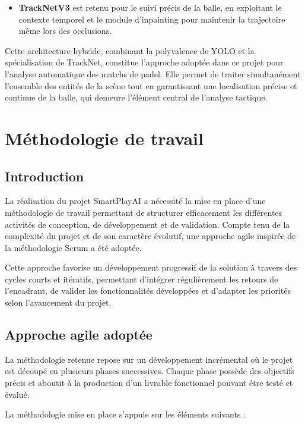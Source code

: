 \begin{itemize}
\begin{itemize}
    \item \textbf{TrackNetV3} est retenu pour le suivi précis de la balle, en
    exploitant le contexte temporel et le module d'inpainting pour maintenir la
    trajectoire même lors des occlusions.
\end{itemize}

Cette architecture hybride, combinant la polyvalence de YOLO et la spécialisation de
TrackNet, constitue l'approche adoptée dans ce projet pour l'analyse automatique des
matchs de padel. Elle permet de traiter simultanément l'ensemble des entités de la
scène tout en garantissant une localisation précise et continue de la balle, qui
demeure l'élément central de l'analyse tactique.

\section{Méthodologie de travail}

\subsection{Introduction}
La réalisation du projet SmartPlayAI a nécessité la mise en place d'une méthodologie de travail permettant de structurer efficacement les différentes activités de conception, de développement et de validation. Compte tenu de la complexité du projet et de son caractère évolutif, une approche agile inspirée de la méthodologie Scrum a été adoptée.

Cette approche favorise un développement progressif de la solution à travers des cycles courts et itératifs, permettant d'intégrer régulièrement les retours de l'encadrant, de valider les fonctionnalités développées et d'adapter les priorités selon l'avancement du projet.

\subsection{Approche agile adoptée}
La méthodologie retenue repose sur un développement incrémental où le projet est découpé en plusieurs phases successives. Chaque phase possède des objectifs précis et aboutit à la production d'un livrable fonctionnel pouvant être testé et évalué.

La méthodologie mise en place s'appuie sur les éléments suivants :


\end{itemize}
